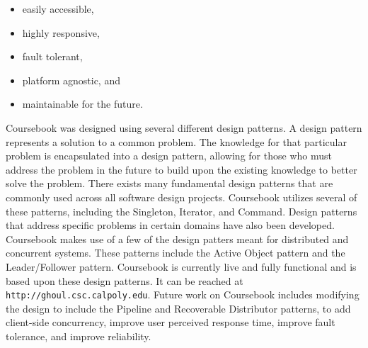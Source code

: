 \singlespacing
\begin{itemize}
  \item easily accessible,
  \item highly responsive,
  \item fault tolerant,
  \item platform agnostic, and
  \item maintainable for the future.
\end{itemize}
\doublespacing

Coursebook was designed using several different design patterns. A design 
pattern represents a solution to a common problem. The knowledge for that 
particular problem is encapsulated into a design pattern, allowing for those who 
must address the problem in the future to build upon the existing knowledge to 
better solve the problem. There exists many fundamental design patterns that are 
commonly used across all software design projects. Coursebook utilizes several of 
these patterns, including the Singleton, Iterator, and Command. Design patterns 
that address specific problems in certain domains have also been developed. 
Coursebook makes use of a few of the design patters meant for distributed and 
concurrent systems. These patterns include the Active Object pattern and the 
Leader/Follower pattern. Coursebook is currently live and fully functional and is 
based upon these design patterns. It can be reached at 
\verb!http://ghoul.csc.calpoly.edu!. Future work on Coursebook includes
modifying the design to include the Pipeline and Recoverable Distributor
patterns, to add client-side concurrency, improve user perceived response time,
improve fault tolerance, and improve reliability.


